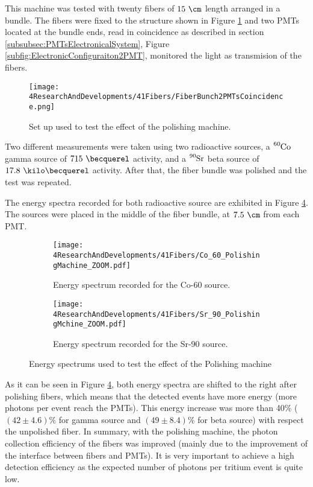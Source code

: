 This machine was tested with twenty fibers of $15~\cm$ length arranged in a bundle. The fibers were fixed to the structure shown in Figure \ref{fig:BunchWith2PMTsCoincidence} and two PMTs located at the bundle ends, read in coincidence as described in section \ref{subsubsec:PMTsElectronicalSystem}, Figure \ref{subfig:ElectronicConfiguraiton2PMT}, monitored the light as transmision of the fibers.

\begin{figure}[]
\centering
\texttt{[image: 4ResearchAndDevelopments/41Fibers/FiberBunch2PMTsCoincidence.png]}
\caption{Set up used to test the effect of the polishing machine.\label{fig:BunchWith2PMTsCoincidence}}
\end{figure}

Two different measurements were taken using two radioactive sources, a $\ce{^{60}Co}$ gamma source of $715~\becquerel$ activity, and a $\ce{^{90}Sr}$ beta source of $17.8~\kilo\becquerel$ activity. After that, the fiber bundle was polished and the test was repeated.

The energy spectra recorded for both radioactive source are exhibited in Figure \ref{fig:ResultsOfPolishingMachine}. The sources were placed in the middle of the fiber bundle, at $7.5~\cm$ from each PMT.

\begin{figure}
\centering
    \begin{subfigure}[b]{1\textwidth}
    \centering
    \texttt{[image: 4ResearchAndDevelopments/41Fibers/Co\_60\_PolishingMachine\_ZOOM.pdf]}  
    \caption{Energy spectrum recorded for the Co-60 source.\label{subfig:EnergySpectrumCo60PolishingTest}}
    \end{subfigure}
    \hfill
    \begin{subfigure}[b]{1\textwidth}
    \centering
    \texttt{[image: 4ResearchAndDevelopments/41Fibers/Sr\_90\_PolishingMchine\_ZOOM.pdf]}  
    \caption{Energy spectrum recorded for the Sr-90 source.\label{subfig:EnergySpectrumSr90PolishingTest}}
    \end{subfigure}
 \caption{Energy spectrums used to test the effect of the Polishing machine}
 \label{fig:ResultsOfPolishingMachine}
\end{figure}

As it can be seen in Figure \ref{fig:ResultsOfPolishingMachine}, both energy spectra are shifted to the right after polishing fibers, which means that the detected events have more energy (more photons per event reach the PMTs). This energy increase was more than 40\% ($(42 \pm 4.6)\%$ for gamma source and $(49 \pm 8.4)\%$ for beta source) with respect the unpolished fiber. In summary, with the polishing machine, the photon collection efficiency of the fibers was improved  (mainly due to the improvement of the interface between fibers and PMTs). It is very important to achieve a high detection efficiency as the expected number of photons per tritium event is quite low.
